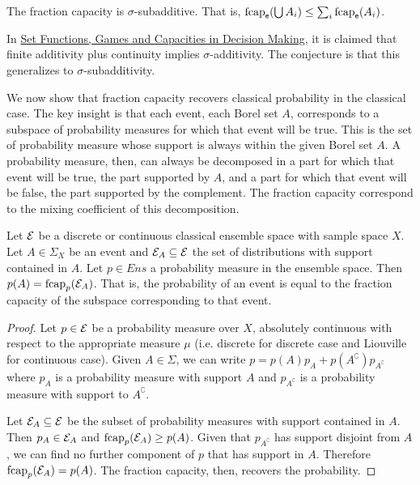 \begin{conj}
	The fraction capacity is $\sigma$-subadditive. That is, $\mathrm{fcap}_{\mathsf{e}}(\bigcup A_i) \leq \sum_i \mathrm{fcap}_{\mathsf{e}}(A_i)$.
\end{conj}

\begin{remark}
	In \href{https://link.springer.com/book/10.1007/978-3-319-30690-2}{Set Functions, Games and Capacities in Decision Making}, it is claimed that finite additivity plus continuity implies $\sigma$-additivity. The conjecture is that this generalizes to $\sigma$-subadditivity.
\end{remark}

We now show that fraction capacity recovers classical probability in the classical case. The key insight is that each event, each Borel set $A$, corresponds to a subspace of probability measures for which that event will be true. This is the set of probability measure whose support is always within the given Borel set $A$. A probability measure, then, can always be decomposed in a part for which that event will be true, the part supported by $A$, and a part for which that event will be false, the part supported by the complement. The fraction capacity correspond to the mixing coefficient of this decomposition.
\begin{mathSection}
	\begin{prop}
		Let $\mathcal{E}$ be a discrete or continuous classical ensemble space with sample space $X$. Let $A \in \Sigma_X$ be an event and $\mathcal{E}_A \subseteq \mathcal{E}$ the set of distributions with support contained in $A$. Let $p \in Ens$ a probability measure in the ensemble space. Then $p(A) = \mathrm{fcap}_{p}(\mathcal{E}_A)$. That is, the probability of an event is equal to the fraction capacity of the subspace corresponding to that event.
	\end{prop}
	\begin{proof}
		Let $p \in \mathcal{E}$ be a probability measure over $X$, absolutely continuous with respect to the appropriate measure $\mu$ (i.e. discrete for discrete case and Liouville for continuous case). Given $A \in \Sigma$, we can write $p = p(A) p_A + p(A^{\complement}) p_{A^{\complement}}$ where  $p_A$ is a probability measure with support $A$ and $p_{A^{\complement}}$ is a probability measure with support to $A^{\complement}$.
		
		Let $\mathcal{E}_A \subseteq \mathcal{E}$ be the subset of probability measures with support contained in $A$. Then $p_A \in \mathcal{E}_A$ and $\mathrm{fcap}_{p}(\mathcal{E}_A) \geq p(A)$. Given that $p_{A^{\complement}}$ has support disjoint from $A$, we can find no further component of $p$ that has support in $A$. Therefore $\mathrm{fcap}_{p}(\mathcal{E}_A) = p(A)$. The fraction capacity, then, recovers the probability.
	\end{proof}
\end{mathSection}
	
